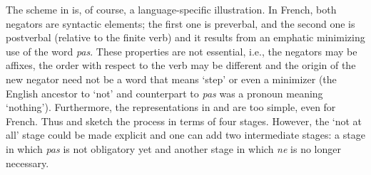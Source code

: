 ﻿\documentclass[output=paper,draft,draftmode,colorlinks,citecolor=brown]{langscibook}
\begin{document}
%
The scheme in  is, of course, a
language-specific illustration. In French, both negators are syntactic
elements; the first one is preverbal, and the second one is postverbal
(relative to the finite verb) and it results from an emphatic minimizing
use of the word \textit{pas}. These properties are not essential, i.e., the
negators may be affixes, the order with respect to the verb may be
different and the origin of the new negator need not be a word that means
`step' or even a minimizer (the English ancestor to `not' and counterpart
to \textit{pas} was a pronoun meaning `nothing'). Furthermore, the
representations in  and 
are too simple, even for French. Thus  and
 sketch the process in
terms of four stages. However, the `not at all' stage could be made
explicit and one can add two intermediate stages: a stage in which
\textit{pas} is not obligatory yet and another stage in which \textit{ne}
is no longer necessary. 
\end{document}
